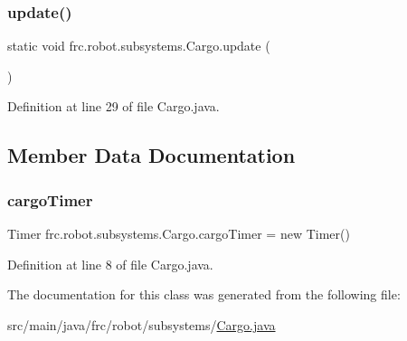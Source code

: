 \subsubsection{\texorpdfstring{update()}{update()}}
{\footnotesize\ttfamily static void frc.\+robot.\+subsystems.\+Cargo.\+update (\begin{DoxyParamCaption}{ }\end{DoxyParamCaption})\hspace{0.3cm}{\ttfamily [static]}}



Definition at line 29 of file Cargo.\+java.



\subsection{Member Data Documentation}
\mbox{\label{classfrc_1_1robot_1_1subsystems_1_1Cargo_a50722902fa0c3ad0db5f592ad51b94f6}} 
\subsubsection{\texorpdfstring{cargo\+Timer}{cargoTimer}}
{\footnotesize\ttfamily Timer frc.\+robot.\+subsystems.\+Cargo.\+cargo\+Timer = new Timer()\hspace{0.3cm}{\ttfamily [static]}}



Definition at line 8 of file Cargo.\+java.



The documentation for this class was generated from the following file\+:\begin{DoxyCompactItemize}
\item 
src/main/java/frc/robot/subsystems/\hyperlink{Cargo_8java}{Cargo.\+java}\end{DoxyCompactItemize}
